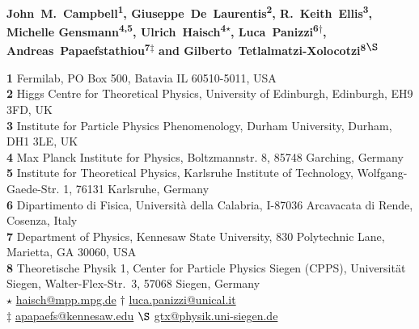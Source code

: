 \documentclass{SciPost}
\begin{document}
\pagestyle{SPstyle}

\begin{center}{\Large \textbf{\color{scipostdeepblue}{
Triple-Higgs-boson probes of the Higgs potential and top--Higgs-boson interactions
}}}\end{center}

\begin{center}\textbf{
{John~M.~Campbell}\textsuperscript{1}, 
{Giuseppe~De~Laurentis}\textsuperscript{2}, 
{R.~Keith~Ellis}\textsuperscript{3}, 
{Michelle Gensmann}\textsuperscript{4,5},
{Ulrich~Haisch}\textsuperscript{4$\star$},
{Luca~Panizzi}\textsuperscript{6$\dagger$},
{Andreas~Papaefstathiou}\textsuperscript{7$\ddagger$} and
{Gilberto~Tetlalmatzi-Xolocotzi}\textsuperscript{8$\S$}
}\end{center}

\begin{center}
{\bf 1 }{Fermilab, PO Box 500, Batavia IL 60510-5011, USA} \\
{\bf 2 }{Higgs Centre for Theoretical Physics, University of Edinburgh, Edinburgh, EH9 3FD, UK} \\
{\bf 3 }{Institute for Particle Physics Phenomenology, Durham University, Durham, DH1 3LE, UK} \\
{\bf 4 }{Max Planck Institute for Physics, Boltzmannstr. 8, 85748 Garching, Germany} \\
{\bf 5 }{Institute for Theoretical Physics, Karlsruhe Institute of Technology, Wolfgang-Gaede-Str. 1, 76131 Karlsruhe, Germany} \\
{\bf 6 }{Dipartimento di Fisica, Università della Calabria, I-87036 Arcavacata di Rende, Cosenza, Italy} \\
{\bf 7 }{Department of Physics, Kennesaw State University, 830 Polytechnic Lane, Marietta, GA 30060, USA} \\
{\bf 8 }{Theoretische Physik 1, Center for Particle Physics Siegen (CPPS), Universität Siegen, Walter-Flex-Str.~3, 57068 Siegen, Germany}
\\[\baselineskip]
$\star$ \href{mailto:haisch@mpp.mpg.de}{\small haisch@mpp.mpg.de} \qquad
$\dagger$ \href{mailto:luca.panizzi@unical.it}{\small luca.panizzi@unical.it} \\
$\ddagger$ \href{mailto:apapaefs@kennesaw.edu}{\small apapaefs@kennesaw.edu} \qquad
$\S$ \href{mailto:gtx@physik.uni-siegen.de}{\small gtx@physik.uni-siegen.de}
\end{center}
\end{document}
